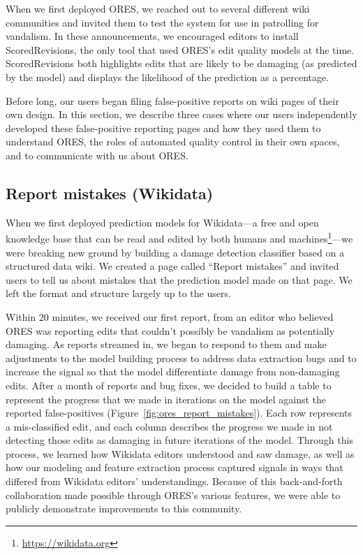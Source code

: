 When we first deployed ORES, we reached out to several different wiki communities and invited them to test the system for use in patrolling for vandalism.  In these announcements, we encouraged editors to install ScoredRevisions, the only tool that used ORES's edit quality models at the time.  ScoredRevisions both highlights edits that are likely to be damaging (as predicted by the model) and displays the likelihood of the prediction as a percentage.

Before long, our users began filing false-positive reports on wiki pages of their own design.  In this section, we describe three cases where our users independently developed these false-positive reporting pages and how they used them to understand ORES, the roles of automated quality control in their own spaces, and to communicate with us about ORES.

\subsection{Report mistakes (Wikidata)}

When we first deployed prediction models for Wikidata---a free and open knowledge base that can be read and edited by both humans and machines\footnote{\url{https://wikidata.org}}---we were breaking new ground by building a damage detection classifier based on a structured data wiki\cite{sarabadani2017building}.  We created a page called ``Report mistakes'' and invited users to tell us about mistakes that the prediction model made on that page. We left the format and structure largely up to the users.

Within 20 minutes, we received our first report, from an editor who believed ORES was reporting edits that couldn't possibly be vandalism as potentially damaging.  As reports streamed in, we began to respond to them and make adjustments to the model building process to address data extraction bugs and to increase the signal so that the model differentiate damage from non-damaging edits.  After a month of reports and bug fixes, we decided to build a table to represent the progress that we made in iterations on the model against the reported false-positives (Figure~\ref{fig:ores_report_mistakes}).  Each row represents a mis-classified edit, and each column describes the progress we made in not detecting those edits as damaging in future iterations of the model.  Through this process, we learned how Wikidata editors understood and saw damage, as well as how our modeling and feature extraction process captured signals in ways that differed from Wikidata editors' understandings.  Because of this back-and-forth collaboration made possible through ORES's various features, we were able to publicly demonstrate improvements to this community.


